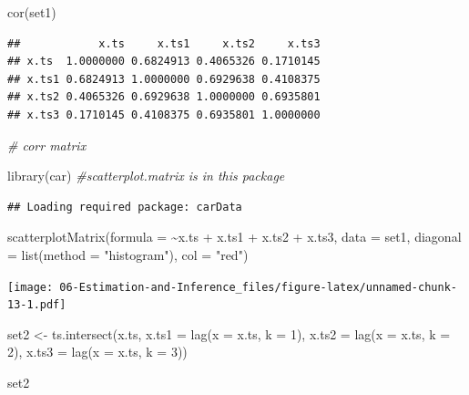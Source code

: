 \documentclass[
]{book}
\newenvironment{Shaded}{\begin{snugshade}}{\end{snugshade}}
\newcommand{\AttributeTok}[1]{\textcolor[rgb]{0.77,0.63,0.00}{#1}}
\newcommand{\CommentTok}[1]{\textcolor[rgb]{0.56,0.35,0.01}{\textit{#1}}}
\newcommand{\DecValTok}[1]{\textcolor[rgb]{0.00,0.00,0.81}{#1}}
\newcommand{\FunctionTok}[1]{\textcolor[rgb]{0.00,0.00,0.00}{#1}}
\newcommand{\NormalTok}[1]{#1}
\newcommand{\OtherTok}[1]{\textcolor[rgb]{0.56,0.35,0.01}{#1}}
\newcommand{\SpecialCharTok}[1]{\textcolor[rgb]{0.00,0.00,0.00}{#1}}
\newcommand{\StringTok}[1]{\textcolor[rgb]{0.31,0.60,0.02}{#1}}
\theoremstyle{definition}
\theoremstyle{definition}
\theoremstyle{definition}
\theoremstyle{definition}
\theoremstyle{remark}
\begin{document}
\begin{Shaded}
\begin{Highlighting}[]
\FunctionTok{cor}\NormalTok{(set1)}
\end{Highlighting}
\end{Shaded}

\begin{verbatim}
##            x.ts     x.ts1     x.ts2     x.ts3
## x.ts  1.0000000 0.6824913 0.4065326 0.1710145
## x.ts1 0.6824913 1.0000000 0.6929638 0.4108375
## x.ts2 0.4065326 0.6929638 1.0000000 0.6935801
## x.ts3 0.1710145 0.4108375 0.6935801 1.0000000
\end{verbatim}

\begin{Shaded}
\begin{Highlighting}[]
\CommentTok{\# corr matrix}
\end{Highlighting}
\end{Shaded}

\begin{Shaded}
\begin{Highlighting}[]
\FunctionTok{library}\NormalTok{(car) }\CommentTok{\#scatterplot.matrix is in this package }
\end{Highlighting}
\end{Shaded}

\begin{verbatim}
## Loading required package: carData
\end{verbatim}

\begin{Shaded}
\begin{Highlighting}[]
\FunctionTok{scatterplotMatrix}\NormalTok{(}\AttributeTok{formula =} \SpecialCharTok{\textasciitilde{}}\NormalTok{x.ts }\SpecialCharTok{+}\NormalTok{ x.ts1 }\SpecialCharTok{+}\NormalTok{ x.ts2 }\SpecialCharTok{+}\NormalTok{ x.ts3, }\AttributeTok{data =}\NormalTok{ set1,}
    \AttributeTok{diagonal =} \FunctionTok{list}\NormalTok{(}\AttributeTok{method =} \StringTok{"histogram"}\NormalTok{), }\AttributeTok{col =} \StringTok{"red"}\NormalTok{)}
\end{Highlighting}
\end{Shaded}

\texttt{[image: 06-Estimation-and-Inference\_files/figure-latex/unnamed-chunk-13-1.pdf]}

\begin{Shaded}
\begin{Highlighting}[]
\NormalTok{set2 }\OtherTok{\textless{}{-}} \FunctionTok{ts.intersect}\NormalTok{(x.ts, }\AttributeTok{x.ts1 =} \FunctionTok{lag}\NormalTok{(}\AttributeTok{x =}\NormalTok{ x.ts, }\AttributeTok{k =} \DecValTok{1}\NormalTok{), }\AttributeTok{x.ts2 =} \FunctionTok{lag}\NormalTok{(}\AttributeTok{x =}\NormalTok{ x.ts, }\AttributeTok{k =} \DecValTok{2}\NormalTok{), }\AttributeTok{x.ts3 =} \FunctionTok{lag}\NormalTok{(}\AttributeTok{x =}\NormalTok{ x.ts, }\AttributeTok{k =} \DecValTok{3}\NormalTok{))}

\NormalTok{set2}
\end{Highlighting}
\end{Shaded}
\end{document}
